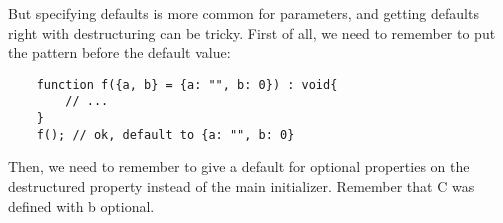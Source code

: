 But specifying defaults is more common for parameters, and getting defaults right with destructuring can be tricky. First of all, we need to remember to put the pattern before the default value:

\begin{lstlisting}
    function f({a, b} = {a: "", b: 0}) : void{
        // ...
    }
    f(); // ok, default to {a: "", b: 0}
\end{lstlisting}

Then, we need to remember to give a default for optional properties on the destructured property instead of the main initializer. Remember that C was defined with b optional.